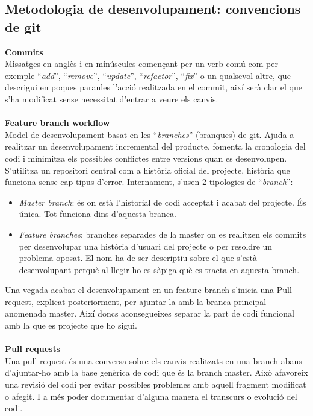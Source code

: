 \subsection{Metodologia de desenvolupament: convencions de git}
\textbf{Commits}
\\
Missatges en anglès i en minúscules començant per un verb comú com per exemple “\textit{add}”, “\textit{remove}”, “\textit{update}”, “\textit{refactor}”, “\textit{fix}” o un qualsevol altre, que descrigui en poques paraules l'acció realitzada en el commit, així serà clar el que s'ha modificat sense necessitat d'entrar a veure els canvis.
\\\\
\textbf{Feature branch workflow}
\\
Model de desenvolupament basat en les “\textit{branches}” (branques) de git. Ajuda a realitzar un desenvolupament incremental del producte, fomenta la cronologia del codi i minimitza els possibles conflictes entre versions quan es desenvolupen. S'utilitza un repositori central com a història oficial del projecte, història que funciona sense cap tipus d'error. Internament, s'usen 2 tipologies de “\textit{branch}”:
\begin{itemize}
\item \textit{Master branch}: és on està l'historial de codi acceptat i acabat del projecte. És única. Tot funciona dins d'aquesta branca.
\item \textit{Feature branches}: branches separades de la master on es realitzen els commits per desenvolupar una història d'usuari del projecte o per resoldre un problema oposat. El nom ha de ser descriptiu sobre el que s'està desenvolupant perquè al llegir-ho es sàpiga què es tracta en aquesta branch.
\end{itemize}
Una vegada acabat el desenvolupament en un feature branch s'inicia una Pull request, explicat posteriorment, per ajuntar-la amb la branca principal anomenada master. Així doncs aconsegueixes separar la part de codi funcional amb la que es projecte que ho sigui.
\\\\
\textbf{Pull requests}
\\
Una pull request és una conversa sobre els canvis realitzats en una branch abans d'ajuntar-ho amb la base genèrica de codi que és la branch master. Això afavoreix una revisió del codi per evitar possibles problemes amb aquell fragment modificat o afegit. I a més poder documentar d'alguna manera el transcurs o evolució del codi.

